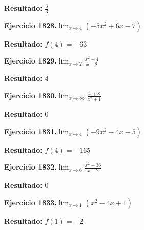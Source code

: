 \documentclass[10pt,a4paper]{article}
\begin{document}
\begin{solbox}
\textbf{Resultado:} \(\displaystyle \frac{3}{3}\)
\end{solbox}

\newpage
\begin{ejbox}
\textbf{Ejercicio 1828.}\quad $\lim_{x\to 4} (-5x^2 +6x -7)$
\end{ejbox}

\begin{solbox}
\textbf{Resultado:} \(\displaystyle f(4) = -63\)
\end{solbox}

\begin{ejbox}
\textbf{Ejercicio 1829.}\quad $\lim_{x\to 2} \frac{x^2-4}{x-2}$
\end{ejbox}

\begin{solbox}
\textbf{Resultado:} \(\displaystyle 4\)
\end{solbox}

\begin{ejbox}
\textbf{Ejercicio 1830.}\quad $\lim_{x\to \infty} \frac{x + 8}{x^2 + 1}$
\end{ejbox}

\begin{solbox}
\textbf{Resultado:} \(\displaystyle 0\)
\end{solbox}

\newpage
\begin{ejbox}
\textbf{Ejercicio 1831.}\quad $\lim_{x\to 4} (-9x^2 -4x -5)$
\end{ejbox}

\begin{solbox}
\textbf{Resultado:} \(\displaystyle f(4) = -165\)
\end{solbox}

\begin{ejbox}
\textbf{Ejercicio 1832.}\quad $\lim_{x\to 6} \frac{x^2-36}{x+2}$
\end{ejbox}

\begin{solbox}
\textbf{Resultado:} \(\displaystyle 0\)
\end{solbox}

\begin{ejbox}
\textbf{Ejercicio 1833.}\quad $\lim_{x\to 1} (x^2 -4x +1)$
\end{ejbox}

\begin{solbox}
\textbf{Resultado:} \(\displaystyle f(1) = -2\)
\end{solbox}
\end{document}
